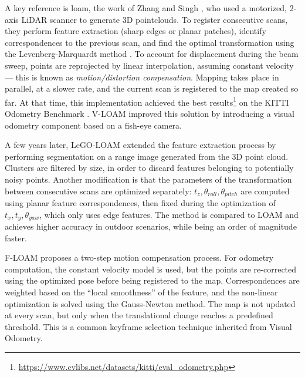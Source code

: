 


A key reference is \acrfull{loam}, the work of Zhang and Singh \cite{zhang2014loam}, who used a motorized, 2-axis LiDAR scanner to generate 3D pointclouds. To register consecutive scans, they perform feature extraction (sharp edges or planar patches), identify correspondences to the previous scan, and find the optimal transformation using the Levenberg-Marquardt method \cite{levenberg1944method,marquardt}. To account for displacement during the beam sweep, points are reprojected by linear interpolation, assuming constant velocity --- this is known as \emph{motion/distortion compensation}. Mapping takes place in parallel, at a slower rate, and the current scan is registered to the map created so far. At that time, this implementation achieved the best results\footnote{\url{https://www.cvlibs.net/datasets/kitti/eval_odometry.php}} on the KITTI Odometry Benchmark \cite{geiger2012kitti}. V-LOAM \cite{zhang2015visual} improved this solution by introducing a visual odometry component based on a fish-eye camera.

A few years later, LeGO-LOAM \cite{legoloam2018} extended the feature extraction process by performing segmentation on a range image generated from the 3D point cloud. Clusters are filtered by size, in order to discard features belonging to potentially noisy points. Another modification is that the parameters of the transformation between consecutive scans are optimized separately: $t_z, \theta_{roll}, \theta_{pitch}$ are computed using planar feature correspondences, then fixed during the optimization of $t_x, t_y, \theta_{yaw}$, which only uses edge features. The method is compared to LOAM and achieves higher accuracy in outdoor scenarios, while being an order of magnitude faster.

F-LOAM \cite{wang2021f} proposes a two-step motion compensation process. For odometry computation, the constant velocity model is used, but the points are re-corrected using the optimized pose before being registered to the map. Correspondences are weighted based on the ``local smoothness'' of the feature, and the non-linear optimization is solved using the Gauss-Newton method. The map is not updated at every scan, but only when the translational change reaches a predefined threshold. This is a common \gls{keyframe} selection technique inherited from Visual Odometry.

